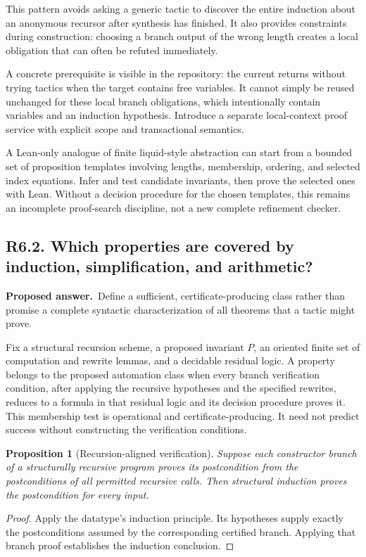 \documentclass[11pt,a4paper]{article}
\newcommand{\code}[1]{\texttt{\small\detokenize{#1}}}
\newcommand{\question}[2]{\subsection{#1. #2}\label{q:#1}}
\newcommand{\answer}{\textbf{Proposed answer.}\ }
\newtheorem{proposition}{Proposition}[section]
\theoremstyle{remark}
\begin{document}
This pattern avoids asking a generic tactic to discover the entire induction
about an anonymous recursor after synthesis has finished. It also provides
constraints during construction: choosing a branch output of the wrong
length creates a local obligation that can often be refuted immediately.

A concrete prerequisite is visible in the repository: the current
\code{proofPortfolio} returns without trying tactics when the target contains
free variables. It cannot simply be reused unchanged for these local branch
obligations, which intentionally contain variables and an induction
hypothesis. Introduce a separate local-context proof service with explicit
scope and transactional semantics.\cite{leantcore}

A Lean-only analogue of finite liquid-style abstraction can start from a
bounded set of proposition templates involving lengths, membership, ordering,
and selected index equations. Infer and test candidate invariants, then
prove the selected ones with Lean. Without a decision procedure for the
chosen templates, this remains an incomplete proof-search discipline, not a
new complete refinement checker.

\question{R6.2}{Which properties are covered by induction, simplification, and arithmetic?}

\answer Define a sufficient, certificate-producing class rather than promise
a complete syntactic characterization of all theorems that a tactic might
prove.

Fix a structural recursion scheme, a proposed invariant $P$, an oriented
finite set of computation and rewrite lemmas, and a decidable residual
logic. A property belongs to the proposed automation class when every branch
verification condition, after applying the recursive hypotheses and the
specified rewrites, reduces to a formula in that residual logic and its
decision procedure proves it. This membership test is operational and
certificate-producing. It need not predict success without constructing the
verification conditions.

\begin{proposition}[Recursion-aligned verification]
Suppose each constructor branch of a structurally recursive program proves
its postcondition from the postconditions of all permitted recursive calls.
Then structural induction proves the postcondition for every input.
\end{proposition}
\begin{proof}
Apply the datatype's induction principle. Its hypotheses supply exactly the
postconditions assumed by the corresponding certified branch. Applying that
branch proof establishes the induction conclusion.
\end{proof}
\end{document}

